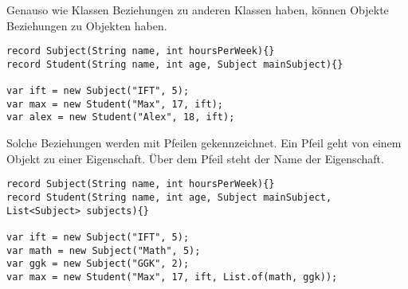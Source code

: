 \documentclass[a4paper]{scrartcl}
\begin{document}
Genauso wie Klassen Beziehungen zu anderen Klassen haben, können Objekte Beziehungen zu Objekten haben.
\begin{verbatim}
record Subject(String name, int hoursPerWeek){}
record Student(String name, int age, Subject mainSubject){}

var ift = new Subject("IFT", 5);
var max = new Student("Max", 17, ift);
var alex = new Student("Alex", 18, ift);
\end{verbatim}
Solche Beziehungen werden mit Pfeilen gekennzeichnet. 
Ein Pfeil geht von einem Objekt zu einer Eigenschaft.
Über dem Pfeil steht der Name der Eigenschaft.



\newpage

\begin{verbatim}
record Subject(String name, int hoursPerWeek){}
record Student(String name, int age, Subject mainSubject, List<Subject> subjects){}

var ift = new Subject("IFT", 5);
var math = new Subject("Math", 5);
var ggk = new Subject("GGK", 2);
var max = new Student("Max", 17, ift, List.of(math, ggk));
\end{verbatim}
\end{document}
